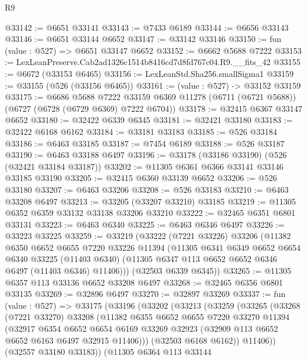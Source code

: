\begin{lexlean}{R9}
\begin{coremodule}
@33142 := @6651 @33141
@33143 := @7433 @6189
@33144 := @6656 @33143
@33146 := @6651 @33144 @6652
@33147 := @33142 @33146
@33150 := fun (value : @527) => @6651 @33147 @6652
@33152 := @6662 @5688 @7222
@33153 := LexLeanPreserve.Cab2ad1326c1514b8416cd7d8fd767c04.R9.__fits_42
@33155 := @6672 (@33153 @6465)
@33156 := LexLeanStd.Sha256.smallSigma1
@33159 := @33155 (@526 (@33156 @6465))
@33161 := (value : @527) -> @33152 @33159
@33175 := @6686
    @5688
    @7222
    @33159
    @6369
    @11278
    (@6711 (@6721 @5688))
    (@6727 (@6728 (@6729 @6369) @7222 @6704))
@33178 := @32415 @6367 @33147 @6652
@33180 := @32422 @6339 @6345
@33181 := @32421 @33180
@33183 := @32422 @6168 @6162
@33184 := @33181 @33183
@33185 := @526 @33184
@33186 := @6463 @33185
@33187 := @7454 @6189
@33188 := @526 @33187
@33190 := @6463 @33188 @6497
@33196 := @33178 (@33186 @33190) (@526 (@32421 @33184 @33187))
@33202 := @11305 @6361 @6366 @33141 @33146 @33185 @33190
@33205 := @32415 @6360 @33139 @6652
@33206 := @526 @33180
@33207 := @6463 @33206
@33208 := @526 @33183
@33210 := @6463 @33208 @6497
@33213 := @33205 (@33207 @33210) @33185
@33219 := @11305 @6352 @6359 @33132 @33138 @33206 @33210
@33222 := @32465 @6351 @6801 @33131
@33223 := @6463 @6340
@33225 := @6463 @6346 @6497
@33226 := @33223 @33225
@33259 := @33219
    (@33222
      (@7221 @33226)
      @33206
      (@11382
        @6350
        @6652
        @6655
        @7220
        @33226
        @11394
        (@11305
          @6341
          @6349
          @6652
          @6654
          @6340
          @33225
          (@11403 @6340)
          (@11305 @6347 @113 @6652 @6652 @6346 @6497 (@11403 @6346) @11406)))
      (@32503 @6339 @6345))
@33265 := @11305 @6357 @113 @33136 @6652 @33208 @6497
@33268 := @32465 @6356 @6801 @33135
@33269 := @32896 @6497
@33270 := @32897 @33269
@33337 := fun (value : @527) =>
  @33175
    (@33196
      (@33202
        (@33213
          (@33259
            (@33265
              (@33268
                (@7221 @33270)
                @33208
                (@11382
                  @6355
                  @6652
                  @6655
                  @7220
                  @33270
                  @11394
                  (@32917
                    @6354
                    @6652
                    @6654
                    @6169
                    @33269
                    @32923
                    (@32909 @113 @6652 @6652 @6163 @6497 @32915 @11406)))
                (@32503 @6168 @6162))
              @11406))
          (@32557 @33180 @33183))
        (@11305
          @6364
          @113
          @33144

\end{coremodule}
\end{lexlean}
